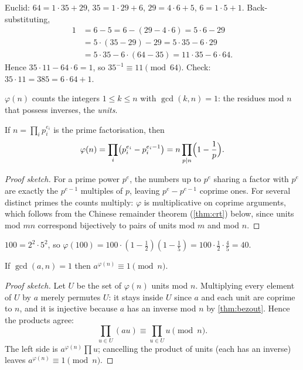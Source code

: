 \begin{example}
Euclid: $64 = 1\cdot 35+29$, $35 = 1\cdot 29+6$, $29 = 4\cdot 6+5$,
$6 = 1\cdot 5+1$. Back-substituting,
\begin{align*}
1 &= 6 - 5 = 6 - (29 - 4\cdot 6) = 5\cdot 6 - 29 \\
  &= 5\cdot(35 - 29) - 29 = 5\cdot 35 - 6\cdot 29 \\
  &= 5\cdot 35 - 6\cdot(64 - 35) = 11\cdot 35 - 6\cdot 64.
\end{align*}
Hence $35 \cdot 11 - 64 \cdot 6 = 1$, so $35^{-1} \equiv 11 \pmod{64}$.
Check: $35 \cdot 11 = 385 = 6\cdot 64 + 1$.
\end{example}

\begin{definition}\label{def:totient}
$\varphi(n)$ counts the integers $1 \le k \le n$ with $\gcd(k,n)=1$:
the residues mod $n$ that possess inverses, the \emph{units}.
\end{definition}

\begin{theorem}\label{thm:totient-formula}
If $n = \prod_i p_i^{e_i}$ is the prime factorisation, then
\[
  \varphi(n) = \prod_i \bigl(p_i^{e_i} - p_i^{e_i-1}\bigr)
  = n\prod_{p \mid n}\Bigl(1-\frac1p\Bigr).
\]
\end{theorem}

\begin{proof}[Proof sketch]
For a prime power $p^e$, the numbers up to $p^e$ sharing a factor with
$p^e$ are exactly the $p^{e-1}$ multiples of $p$, leaving
$p^e-p^{e-1}$ coprime ones. For several distinct primes the counts
multiply: $\varphi$ is multiplicative on coprime arguments, which follows
from the Chinese remainder theorem (\cref{thm:crt}) below, since units
mod $mn$ correspond bijectively to pairs of units mod $m$ and mod $n$.
\end{proof}

\begin{example}[$\varphi(100)$]
$100 = 2^2\cdot 5^2$, so
$\varphi(100) = 100\cdot(1-\tfrac12)(1-\tfrac15) = 100\cdot\tfrac12\cdot\tfrac45 = 40$.
\end{example}

\begin{theorem}[Euler]\label{thm:euler}
If $\gcd(a,n)=1$ then $a^{\varphi(n)} \equiv 1 \pmod{n}$.
\end{theorem}

\begin{proof}[Proof sketch]
Let $U$ be the set of $\varphi(n)$ units mod $n$. Multiplying every
element of $U$ by $a$ merely permutes $U$: it stays inside $U$ since
$a$ and each unit are coprime to $n$, and it is injective because $a$
has an inverse mod $n$ by \cref{thm:bezout}. Hence the products agree:
\[
  \prod_{u \in U}(au) \equiv \prod_{u \in U} u \pmod{n}.
\]
The left side is $a^{\varphi(n)}\prod u$; cancelling the product of
units (each has an inverse) leaves $a^{\varphi(n)} \equiv 1 \pmod{n}$.
\end{proof}

